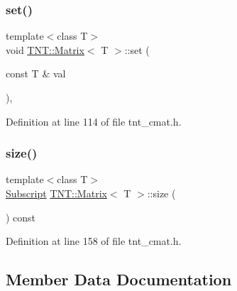 \mbox{\label{classTNT_1_1Matrix_a9bafeab51d069cf4bf310540e0a05df6}} 
\subsubsection{\texorpdfstring{set()}{set()}}
{\footnotesize\ttfamily template$<$class T$>$ \\
void \hyperlink{classTNT_1_1Matrix}{T\+N\+T\+::\+Matrix}$<$ T $>$\+::set (\begin{DoxyParamCaption}\item[{const T \&}]{val }\end{DoxyParamCaption})\hspace{0.3cm}{\ttfamily [inline]}, {\ttfamily [protected]}}



Definition at line 114 of file tnt\+\_\+cmat.\+h.

\mbox{\label{classTNT_1_1Matrix_a3dfd456614090dc8057721961e4972bc}} 
\subsubsection{\texorpdfstring{size()}{size()}}
{\footnotesize\ttfamily template$<$class T$>$ \\
\hyperlink{namespaceTNT_af22e3f1460e145c04ce4e7d701e4c1c1}{Subscript} \hyperlink{classTNT_1_1Matrix}{T\+N\+T\+::\+Matrix}$<$ T $>$\+::size (\begin{DoxyParamCaption}{ }\end{DoxyParamCaption}) const\hspace{0.3cm}{\ttfamily [inline]}}



Definition at line 158 of file tnt\+\_\+cmat.\+h.



\subsection{Member Data Documentation}
\mbox{\label{classTNT_1_1Matrix_a72e92c4629de6a79ac12a1039f461b6f}} 
